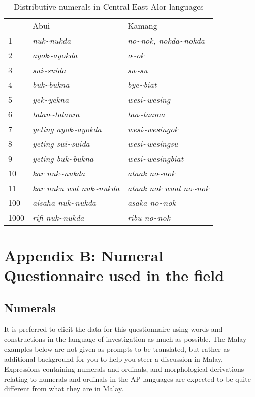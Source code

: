 \begin{table}\centering
\caption{Distributive numerals in Central-East Alor languages}




\begin{tabular}{lll} & Abui & Kamang\\
1 & \textit{nuk\~{}nukda} & \textit{no\~{}nok, nokda\~{}nokda}\\
2 & \textit{ayok\~{}ayokda} & \textit{o\~{}ok } \\
3 & \textit{sui\~{}suida} & \textit{su\~{}su}\\
4 & \textit{buk\~{}bukna} & \textit{bye\~{}biat}\\
5 & \textit{yek\~{}yekna} & \textit{wesi\~{}wesing}\\
6 & \textit{talan\~{}talanra} & \textit{taa\~{}taama}\\
7 & \textit{yeting ayok\~{}ayokda} & \textit{wesi\~{}wesingok}\\
8 & \textit{yeting sui\~{}suida} & \textit{wesi\~{}wesingsu}\\
9 & \textit{yeting buk\~{}bukna} & \textit{wesi\~{}wesingbiat}\\
10 & \textit{kar nuk\~{}nukda} & \textit{ataak no\~{}nok}\\
11 & \textit{kar nuku wal nuk\~{}nukda} & \textit{ataak nok waal no\~{}nok}\\
100 & \textit{aisaha nuk}\textit{\~{}}\textit{nukda} & \textit{asaka no}\textit{\~{}}\textit{nok}\\
1000 & \textit{rifi nuk}\textit{\~{}}\textit{nukda} & \textit{ribu no}\textit{\~{}}\textit{nok}\\
\end{tabular}
\end{table}


\section*{Appendix B: Numeral Questionnaire used in the field}
\subsection*{Numerals}
It is preferred to elicit the data for this questionnaire using words and constructions in the language of investigation as much as possible. The Malay examples below are not given as prompts to be translated, but rather as additional background for you to help you steer a discussion in Malay. Expressions containing numerals and ordinals, and morphological derivations relating to numerals and ordinals in the AP languages are expected to be quite different from what they are in Malay.

